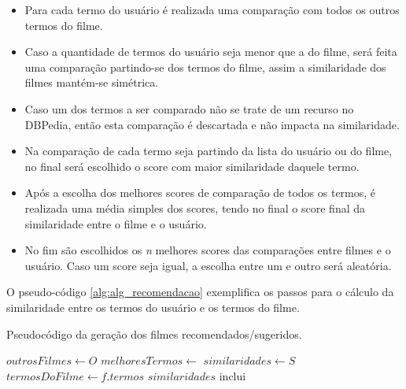 \begin{itemize}
	\item{Para cada termo do usuário é realizada uma comparação com todos os outros termos do filme.}
	\item{Caso a quantidade de termos do usuário seja menor que a do filme, será feita uma comparação partindo-se dos termos do filme, assim a similaridade dos filmes mantém-se simétrica.}
	\item{Caso um dos termos a ser comparado não se trate de um recurso no DBPedia, então esta comparação é descartada e não impacta na similaridade.}
	\item{Na comparação de cada termo seja partindo da lista do usuário ou do filme, no final será escolhido o score com maior similaridade daquele termo.}
	\item{Após a escolha dos melhores scores de comparação de todos os termos, é realizada uma média simples dos scores, tendo no final o score final da similaridade entre o filme e o usuário.}
	\item{No fim são escolhidos os \textit{n} melhores scores das comparações entre filmes e o usuário. Caso um score seja igual, a escolha entre um e outro será aleatória.}
\end{itemize}

O pseudo-código \ref{alg:alg_recomendacao} exemplifica os passos para o cálculo da similaridade entre os termos do usuário e os termos do filme.

\begin{algorithm}
    \label{alg:alg_recomendacao}
	\caption{Pseudocódigo da geração dos filmes recomendados/sugeridos.}
    \begin{algorithmic}[1]
        	\State  $outrosFilmes\gets O$
        	\State $melhoresTermos\gets$ 
        	\State $similaridades\gets S$
        		\State $termosDoFilme\gets f.termos$
        		\State $similaridades$ {inclui} 
        	\EndFor
        \EndFunction
    \end{algorithmic}
\end{algorithm}

